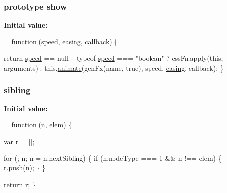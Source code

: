 \subsubsection[{\texorpdfstring{show}{show}}]{ {\bf prototype} show}\hypertarget{jquery-2_82_81-vsdoc_8js_a8dcdb81268297f0ecf76be5e6aebd05c}{}\label{jquery-2_82_81-vsdoc_8js_a8dcdb81268297f0ecf76be5e6aebd05c}
{\bfseries Initial value\+:}
\begin{DoxyCode}
= \textcolor{keyword}{function} (\hyperlink{jquery-2_82_81-vsdoc_8js_add98c90065e6563cba26ff6d2016c46c}{speed}, \hyperlink{jquery-2_82_81-vsdoc_8js_a9758a312629fa6de1744280dd6e6253b}{easing}, callback) \{
        

        \textcolor{keywordflow}{return} \hyperlink{jquery-2_82_81-vsdoc_8js_add98c90065e6563cba26ff6d2016c46c}{speed} == null || typeof \hyperlink{jquery-2_82_81-vsdoc_8js_add98c90065e6563cba26ff6d2016c46c}{speed} === \textcolor{stringliteral}{"boolean"} ?
            cssFn.apply(\textcolor{keyword}{this}, arguments) :
            this.\hyperlink{jquery-2_82_81-vsdoc_8js_a956a1d08128d41115c45b6815814a64d}{animate}(genFx(name, \textcolor{keyword}{true}), speed, \hyperlink{jquery-2_82_81-vsdoc_8js_a9758a312629fa6de1744280dd6e6253b}{easing}, callback);
    \}
\end{DoxyCode}
\subsubsection[{\texorpdfstring{sibling}{sibling}}]{ sibling}\hypertarget{jquery-2_82_81-vsdoc_8js_aab3156d09bb394a1adc703b3daa9a6e5}{}\label{jquery-2_82_81-vsdoc_8js_aab3156d09bb394a1adc703b3daa9a6e5}
{\bfseries Initial value\+:}
\begin{DoxyCode}
= \textcolor{keyword}{function} (n, elem) \{

        var r = [];

        \textcolor{keywordflow}{for} (; n; n = n.nextSibling) \{
            \textcolor{keywordflow}{if} (n.nodeType === 1 && n !== elem) \{
                r.push(n);
            \}
        \}

        \textcolor{keywordflow}{return} r;
    \}
\end{DoxyCode}
